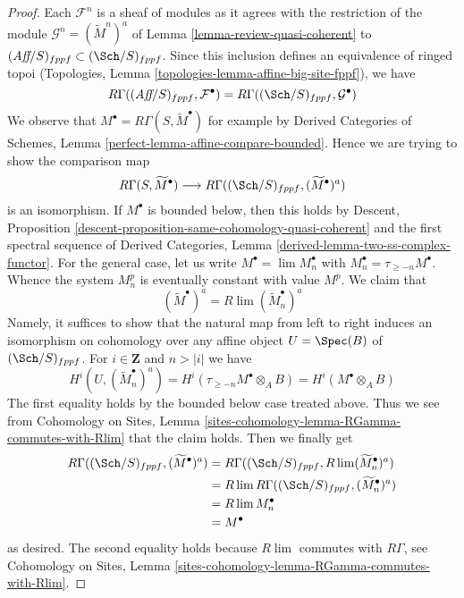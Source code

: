 \begin{proof}
Each $\mathcal{F}^n$ is a sheaf of modules as it agrees with the
restriction of the module $\mathcal{G}^n = (\widetilde{M}^n)^a$ of
Lemma \ref{lemma-review-quasi-coherent} to
$(\textit{Aff}/S)_{fppf} \subset (\Sch/S)_{fppf}$.
Since this inclusion defines an equivalence of ringed topoi
(Topologies, Lemma \ref{topologies-lemma-affine-big-site-fppf}),
we have
$$
R\Gamma((\textit{Aff}/S)_{fppf}, \mathcal{F}^\bullet) =
R\Gamma((\Sch/S)_{fppf}, \mathcal{G}^\bullet)
$$
We observe that $M^\bullet = R\Gamma(S, \widetilde{M}^\bullet)$
for example by Derived Categories of Schemes, Lemma
\ref{perfect-lemma-affine-compare-bounded}. Hence we are trying
to show the comparison map
$$
R\Gamma(S, \widetilde{M}^\bullet)
\longrightarrow
R\Gamma((\Sch/S)_{fppf}, (\widetilde{M}^\bullet)^a)
$$
is an isomorphism. If $M^\bullet$ is bounded below, then this
holds by Descent, Proposition
\ref{descent-proposition-same-cohomology-quasi-coherent}
and the first spectral sequence of Derived Categories, Lemma
\ref{derived-lemma-two-ss-complex-functor}.
For the general case, let us write $M^\bullet = \lim M_n^\bullet$
with $M_n^\bullet = \tau_{\geq -n}M^\bullet$. Whence the system
$M_n^p$ is eventually constant with value $M^p$. We claim that
$$
(\widetilde{M}^\bullet)^a = R\lim (\widetilde{M}_n^\bullet)^a
$$
Namely, it suffices to show that the natural map from left to right
induces an isomorphism on cohomology over any affine object
$U = \Spec(B)$ of $(\Sch/S)_{fppf}$. For $i \in \mathbf{Z}$ and
$n > |i|$ we have
$$
H^i(U, (\widetilde{M}_n^\bullet)^a) =
H^i(\tau_{\geq -n}M^\bullet \otimes_A B) =
H^i(M^\bullet \otimes_A B)
$$
The first equality holds by the bounded below case treated above.
Thus we see from Cohomology on Sites, Lemma
\ref{sites-cohomology-lemma-RGamma-commutes-with-Rlim}
that the claim holds. Then we finally get
\begin{align*}
R\Gamma((\Sch/S)_{fppf}, (\widetilde{M}^\bullet)^a)
& =
R\Gamma((\Sch/S)_{fppf}, R\lim (\widetilde{M}_n^\bullet)^a) \\
& =
R\lim R\Gamma((\Sch/S)_{fppf}, (\widetilde{M}_n^\bullet)^a) \\
& =
R\lim M_n^\bullet \\
& =
M^\bullet
\end{align*}
as desired. The second equality holds because $R\lim$ commutes with
$R\Gamma$, see Cohomology on Sites, Lemma
\ref{sites-cohomology-lemma-RGamma-commutes-with-Rlim}.
\end{proof}










